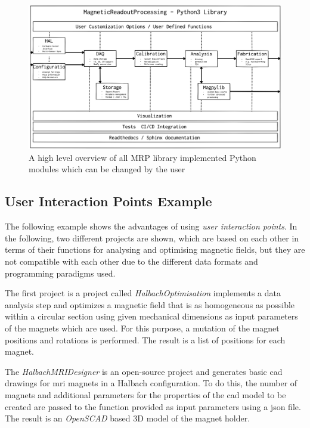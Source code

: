 \begin{figure}
\centering
\includegraphics{./generated_images/border_A_high_level_overview_of_all_MRP_library_implemented_Python_modules_which_can_be_changed_by_the_user.png}
\caption{A high level overview of all MRP library implemented Python
modules which can be changed by the user
\label{A_high_level_overview_of_all_MRP_library_implemented_Python_modules_which_can_be_changed_by_the_user.png}}
\end{figure}

\hypertarget{user-interaction-points-example}{%
\subsection{User Interaction Points
Example}\label{user-interaction-points-example}}

The following example shows the advantages of using \emph{user
interaction points}. In the following, two different projects are shown,
which are based on each other in terms of their functions for analysing
and optimising magnetic fields, but they are not compatible with each
other due to the different data formats and programming paradigms used.

The first project is a project called \emph{HalbachOptimisation}
 implements a data analysis step and optimizes a magnetic
field that is as homogeneous as possible within a circular section using
given mechanical dimensions as input parameters of the magnets which are
used. For this purpose, a mutation of the magnet positions and rotations
is performed. The result is a list of positions for each magnet.

The \emph{HalbachMRIDesigner}  is an open-source project
and generates basic \gls{cad} drawings for \gls{mri} magnets in a
Halbach configuration. To do this, the number of magnets and additional
parameters for the properties of the \gls{cad} model to be created are
passed to the function provided as input parameters using a \gls{json}
file. The result is an \emph{OpenSCAD}  based 3D model
of the magnet holder.

